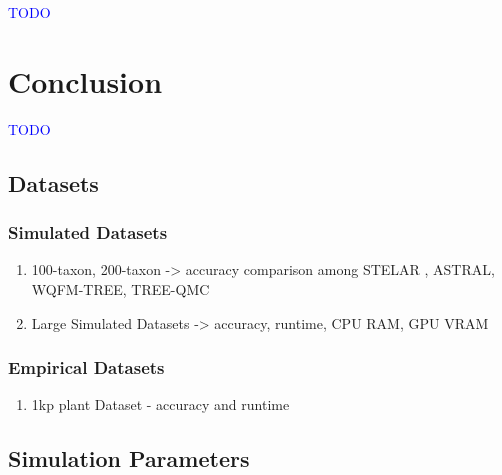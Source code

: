 \documentclass[10pt,a4paper]{article}
\begin{document}
\textcolor{blue}{TODO}


\section{Conclusion}

\textcolor{blue}{TODO}


\subsection{Datasets}

\subsubsection{Simulated Datasets}

\begin{enumerate}
    \item 100-taxon, 200-taxon -> accuracy comparison among STELAR , ASTRAL, WQFM-TREE, TREE-QMC

    \item Large Simulated Datasets -> accuracy, runtime, CPU RAM, GPU VRAM

    

    
\end{enumerate}

\subsubsection{Empirical Datasets}

\begin{enumerate}
    \item 1kp plant Dataset - accuracy and runtime
\end{enumerate}

\subsection{Simulation Parameters}
\end{document}
